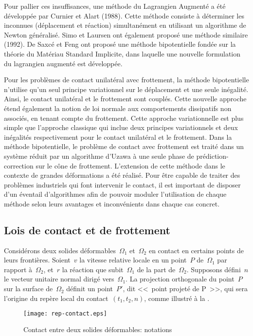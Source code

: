 \medskip
Pour pallier ces insuffisances, une méthode du Lagrangien Augmenté a été développée par
Curnier et Alart (1988).
Cette méthode consiste à déterminer les inconnues (déplacement et réaction) simultanément en
utilisant un algorithme de Newton généralisé.
Simo et
Laursen ont également proposé une méthode similaire (1992).
De Saxcé et
Feng ont proposé une méthode bipotentielle fondée
sur la théorie du Matériau Standard Implicite, dans laquelle une nouvelle formulation du lagrangien
augmenté est développée.

Pour les problèmes de contact unilatéral avec frottement, la méthode bipotentielle n'utilise qu'un seul
principe variationnel sur le déplacement et une seule inégalité.
Ainsi, le contact unilatéral et le frottement sont couplés.
Cette nouvelle approche étend également la notion de loi normale aux comportements dissipatifs non
associés, en tenant compte du frottement.
Cette approche variationnelle est plus simple que l'approche classique qui inclue deux principes variationnels
et deux inégalités respectivement pour le contact unilatéral et le frottement.
Dans la méthode bipotentielle, le problème de contact avec frottement est traité dans un système
réduit par un algorithme d'Uzawa à une seule phase de prédiction-correction sur le cône de frottement.
L'extension de cette méthode dans le contexte de grandes déformations a été réalisé.
Pour être capable de traiter des problèmes industriels qui font intervenir le contact, il est important
de disposer d'un éventail d'algorithmes afin de pouvoir moduler l'utilisation de chaque méthode selon leurs
avantages et inconvénients dans chaque cas concret.

\medskip
\subsection{Lois de contact et de frottement}

Considérons deux solides déformables~$\Omega_1$ et~$\Omega_2$ en contact en certains
points de leurs frontières.
Soient~$v$ la vitesse relative locale en un point~$P$ de~$\Omega_1$ par rapport à~$\Omega_2$,
et~$r$ la réaction que subit~$\Omega_1$ de la part de~$\Omega_2$.
Supposons défini~$n$ le vecteur unitaire normal dirigé vers~$\Omega_1$.
La projection orthogonale du point~$P$ sur la surface de~$\Omega_2$ définit un point~$P'$, dit
<<~point projeté de P~>>, qui sera l'origine du repère local du contact~$(t_1, t_2, n)$,
comme illustré à la .
\begin{figure}[htb]
\centerline{\texttt{[image: rep-contact.eps]}}
\caption{Contact entre deux solides déformables: notations}\label{Fig-rep-contact}
\end{figure}

